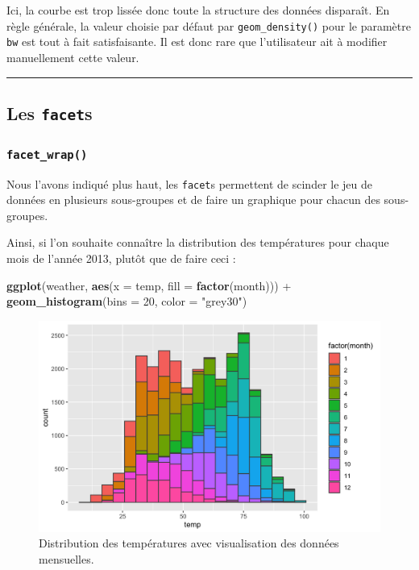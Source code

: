 \documentclass[
  a4paper,
]{article}
\newenvironment{Shaded}{\begin{snugshade}}{\end{snugshade}}
\newcommand{\DataTypeTok}[1]{\textcolor[rgb]{0.00,0.34,0.68}{#1}}
\newcommand{\DecValTok}[1]{\textcolor[rgb]{0.69,0.50,0.00}{#1}}
\newcommand{\KeywordTok}[1]{\textcolor[rgb]{0.12,0.11,0.11}{\textbf{#1}}}
\newcommand{\NormalTok}[1]{\textcolor[rgb]{0.12,0.11,0.11}{#1}}
\newcommand{\OperatorTok}[1]{\textcolor[rgb]{0.12,0.11,0.11}{#1}}
\newcommand{\StringTok}[1]{\textcolor[rgb]{0.75,0.01,0.01}{#1}}
\begin{document}
Ici, la courbe est trop lissée donc toute la structure des données disparaît. En règle générale, la valeur choisie par défaut par \texttt{geom\_density()} pour le paramètre \texttt{bw} est tout à fait satisfaisante. Il est donc rare que l'utilisateur ait à modifier manuellement cette valeur.

\begin{center}\rule{0.5\linewidth}{0.5pt}\end{center}

\hypertarget{facets}{%
\subsection{\texorpdfstring{Les \texttt{facet}s}{Les facets}}\label{facets}}

\hypertarget{facet_wrap}{%
\subsubsection{\texorpdfstring{\texttt{facet\_wrap()}}{facet\_wrap()}}\label{facet_wrap}}

Nous l'avons indiqué plus haut, les \texttt{facet}s permettent de scinder le jeu de données en plusieurs sous-groupes et de faire un graphique pour chacun des sous-groupes.

Ainsi, si l'on souhaite connaître la distribution des températures pour chaque mois de l'année 2013, plutôt que de faire ceci :

\begin{Shaded}
\begin{Highlighting}[]
\KeywordTok{ggplot}\NormalTok{(weather, }\KeywordTok{aes}\NormalTok{(}\DataTypeTok{x =}\NormalTok{ temp, }\DataTypeTok{fill =} \KeywordTok{factor}\NormalTok{(month))) }\OperatorTok{+}
\StringTok{  }\KeywordTok{geom_histogram}\NormalTok{(}\DataTypeTok{bins =} \DecValTok{20}\NormalTok{, }\DataTypeTok{color =} \StringTok{"grey30"}\NormalTok{)}
\end{Highlighting}
\end{Shaded}

\begin{figure}[htpb]

{\centering \includegraphics[width=0.9\linewidth]{figure/unnamed-chunk-52-1} 

}

\caption{Distribution des températures avec visualisation des données mensuelles.}\label{fig:unnamed-chunk-52}
\end{figure}
\end{document}
